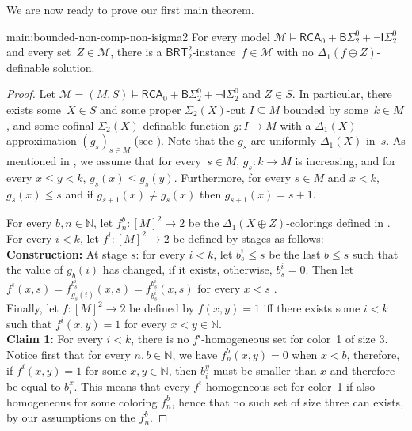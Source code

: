 \documentclass{article}
\def\M{\mathcal{M}}
\newcommand{\ISig}{\mathsf{I}\Sigma^0}
\newcommand{\BSig}{\mathsf{B}\Sigma^0}
\newcommand{\RCA}[0]{\mathsf{RCA}}
\newcommand{\BRT}[0]{\mathsf{BRT}}
\newcommand{\NN}[0]{\mathbb{N}}
\numberwithin{theorem}{section}
\begin{document}
We are now ready to prove our first main theorem.

\begin{repmaintheorem}{main:bounded-non-comp-non-isigma2}
For every model $\M \models \RCA_0 + \BSig_2 + \neg \ISig_2$ and every set~$Z \in \M$, there is a $\BRT^2_2$-instance~$f \in \M$ with no $\Delta_1(f \oplus Z)$-definable solution. 
\end{repmaintheorem}


\begin{proof}
Let $\M = (M, S) \models \RCA_0 + \BSig_2 + \neg \ISig_2$ and $Z \in S$. In particular, there exists some~$X \in S$ and some proper $\Sigma_2(X)$-cut $I \subseteq M$ bounded by some~$k \in M$, and some cofinal $\Sigma_2(X)$ definable function  $g : I \to M$ with a $\Delta_1(X)$ approximation $(g_s)_{s \in M}$ (see ). Note that the $g_s$ are uniformly $\Delta_1(X)$ in~$s$. As mentioned in , we assume that for every~$s \in M$, $g_s : k \to M$ is increasing, and for every $x \leq y < k$, $g_s(x) \leq g_s(y)$. Furthermore, for every $s \in M$ and $x < k$, $g_s(x) \leq s$ and if $g_{s+1}(x) \neq g_s(x)$ then $g_{s+1}(x) = s+1$.


For every $b,n \in \NN$, let $f_{n}^{b} : [M]^2 \to 2$ be the $\Delta_1(X \oplus Z)$-colorings defined in .
For every $i < k$, let $f^i : [M]^2 \to 2$ be defined by stages as follows: \\

\textbf{Construction:} At stage $s$: for every $i < k$, let $b^i_s \leq s$ be the last $b \leq s$ such that the value of $g_b(i)$ has changed, if it exists, otherwise, $b^i_s = 0$. Then let $f^i(x,s) = f_{g_s(i)}^{b^i_s}(x,s) = f^{b^i_s}_{b^i_s}(x,s)$ for every $x < s$ . \\

Finally, let $f : [M]^2 \to 2$ be defined by $f(x,y) = 1$ iff there exists some $i < k$ such that $f^i(x,y) = 1$ for every $x<y \in \NN$. \\


\textbf{Claim 1:} For every $i < k$, there is no $f^i$-homogeneous set for color~1 of size $3$. Notice first that for every $n,b \in \NN$, we have $f_{n}^{b}(x,y) = 0$ when $x < b$, therefore, if $f^i(x,y) = 1$ for some $x,y \in \NN$, then $b_i^y$ must be smaller than $x$ and therefore be equal to $b_i^x$. This means that every $f^i$-homogeneous set for color~1 if also homogeneous for some coloring $f_n^b$, hence that no such set of size three can exists, by our assumptions on the $f_n^b$.
\smallskip



\end{proof}
\end{document}
